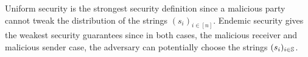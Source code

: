 \begin{remark}
Uniform security is the strongest security definition since a malicious party cannot tweak the distribution of the strings  $(s_i)_{i\in[n]}$. Endemic security gives the weakest security guarantees since in both cases, the malicious receiver and malicious sender case, the adversary can potentially choose the strings $(s_i)_{i\in\mathsf{\mathbb S}}$.
\end{remark}

